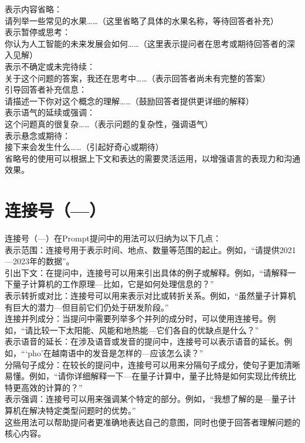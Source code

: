 \documentclass[12pt]{book}
\begin{document}
表示内容省略：\\
请列举一些常见的水果……（这里省略了具体的水果名称，等待回答者补充）\\
表示暂停或思考：\\
你认为人工智能的未来发展会如何……（这里表示提问者在思考或期待回答者的深入见解）\\
表示不确定或未完待续：\\
关于这个问题的答案，我还在思考中……（表示回答者尚未有完整的答案）\\
引导回答者补充信息：\\
请描述一下你对这个概念的理解……（鼓励回答者提供更详细的解释）\\
表示语气的延续或强调：\\
这个问题真的很复杂……（表示问题的复杂性，强调语气）\\
表示悬念或期待：\\
接下来会发生什么……（引起好奇心或期待）\\
省略号的使用可以根据上下文和表达的需要灵活运用，以增强语言的表现力和沟通效果。\\

\section{连接号（—）}
连接号（—）在Prompt提问中的用法可以归纳为以下几点：\\

表示范围：连接号用于表示时间、地点、数量等范围的起止。例如，“请提供2021—2023年的数据”。\\
引出下文：在提问中，连接号可以用来引出具体的例子或解释。例如，“请解释一下量子计算机的工作原理—比如，它是如何处理信息的？”\\
表示转折或对比：连接号可以用来表示对比或转折关系。例如，“虽然量子计算机有巨大的潜力—但目前它们仍处于研发阶段。”\\
连接并列成分：当提问中需要列举多个并列的成分时，可以使用连接号。例如，“请比较一下太阳能、风能和地热能—它们各自的优缺点是什么？”\\
表示语音的延长：在涉及语音或发音的提问中，连接号可以表示语音的延长。例如，“‘pho’在越南语中的发音是怎样的—应该怎么读？”\\
分隔句子成分：在较长的提问中，连接号可以用来分隔句子成分，使句子更加清晰易懂。例如，“请你详细解释一下—在量子计算中，量子比特是如何实现比传统比特更高效的计算的？”\\
表示强调：连接号可以用来强调某个特定的部分。例如，“我想了解的是—量子计算机在解决特定类型问题时的优势。”\\
这些用法可以帮助提问者更准确地表达自己的意图，同时也便于回答者理解问题的核心内容。\\
\end{document}
